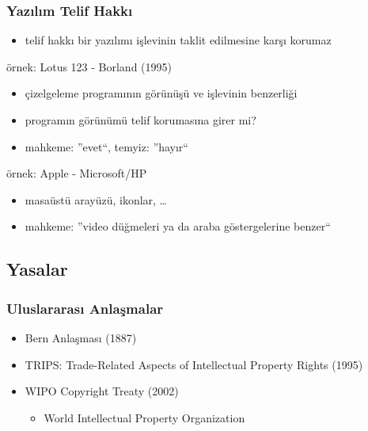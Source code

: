 \documentclass[dvipsnames]{beamer}
\theoremstyle{definition}
\theoremstyle{example}
\theoremstyle{plain}
\begin{document}
\begin{frame}
  \frametitle{Yazılım Telif Hakkı}

  \begin{itemize}
    \item telif hakkı bir yazılımı işlevinin taklit edilmesine karşı korumaz
  \end{itemize}

  \begin{exampleblock}{örnek: Lotus 123 - Borland (1995)}
    \begin{itemize}
      \item çizelgeleme programının görünüşü ve işlevinin benzerliği
      \item programın görünümü telif korumasına girer mi?
      \item mahkeme: ''evet``, temyiz: ''hayır``
    \end{itemize}
  \end{exampleblock}

  \pause
  \begin{exampleblock}{örnek: Apple - Microsoft/HP}
    \begin{itemize}
      \item masaüstü arayüzü, ikonlar, \ldots
      \item mahkeme: ''video düğmeleri ya da araba göstergelerine benzer``
    \end{itemize}
  \end{exampleblock}
\end{frame}

\subsection{Yasalar}

\begin{frame}
  \frametitle{Uluslararası Anlaşmalar}

  \begin{itemize}
    \item Bern Anlaşması (1887)
    \item TRIPS: Trade-Related Aspects of Intellectual Property Rights (1995)
    \item WIPO Copyright Treaty (2002)
    \begin{itemize}
      \item World Intellectual Property Organization
    \end{itemize}
  \end{itemize}
\end{frame}
\end{document}
